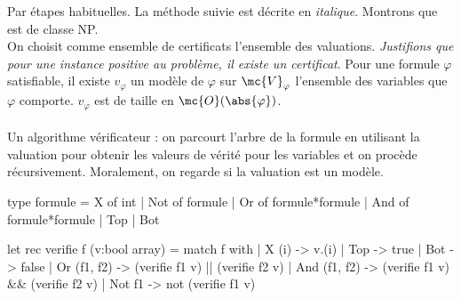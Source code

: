 \begin{demonstration}
    Par étapes habituelles. La méthode suivie est décrite en \textit{italique}.
    Montrons que \cnfsat est de classe NP.\\
    On choisit comme ensemble de certificats l'ensemble des valuations. \textit{Justifions que pour une instance positive au problème, il existe un certificat}. Pour une formule $\varphi$ satisfiable, il existe $v_\varphi$ un modèle de $\varphi$ sur $\mc{V}_\varphi$ l'ensemble des variables que $\varphi$ comporte. $v_\varphi$ est de taille en $\mc{O}(\abs{\varphi})$.\\\\
    Un algorithme vérificateur : on parcourt l'arbre de la formule en utilisant la valuation pour obtenir les valeurs de vérité pour les variables et on procède récursivement. Moralement, on regarde si la valuation est un modèle.
    \begin{lstOCaml}
        type formule =  X of int | Not of formule | Or of formule*formule 
        | And of formule*formule | Top | Bot

        let rec verifie f (v:bool array) = 
            match f with
            | X (i) -> v.(i)
            | Top -> true
            | Bot -> false
            | Or (f1, f2) -> (verifie f1 v) || (verifie f2 v)
            | And (f1, f2) -> (verifie f1 v) && (verifie f2 v)
            | Not f1 -> not (verifie f1 v)
    \end{lstOCaml}
\end{demonstration}

